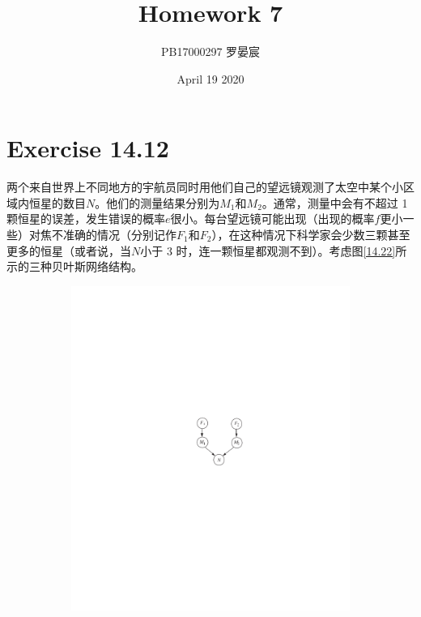 \documentclass{article}
\title{Homework 7}
\author{PB17000297 罗晏宸}
\date{April 19 2020}
\begin{document}
\maketitle

\section{Exercise 14.12}
两个来自世界上不同地方的宇航员同时用他们自己的望远镜观测了太空中某个小区域内恒星的数目$N$。他们的测量结果分别为$M_1$和$M_2$。通常，测量中会有不超过 1 颗恒星的误差，发生错误的概率$e$很小。每台望远镜可能出现（出现的概率$f$更小一些）对焦不准确的情况（分别记作$F_1$和$F_2$），在这种情况下科学家会少数三颗甚至更多的恒星（或者说，当$N$小于 3 时，连一颗恒星都观测不到）。考虑图\ref{14.22}所示的三种贝叶斯网络结构。
\begin{figure}
    \centering
    \begin{subfigure}[t]{0.3\textwidth}
        \centering
        \includegraphics[scale = 0.6]{Figure/14-22(i).pdf}
        \caption{}
        \label{14.22(i)}
    \end{subfigure}
    \begin{subfigure}[t]{0.3\textwidth}

\end{subfigure}
\end{figure}
\end{document}
